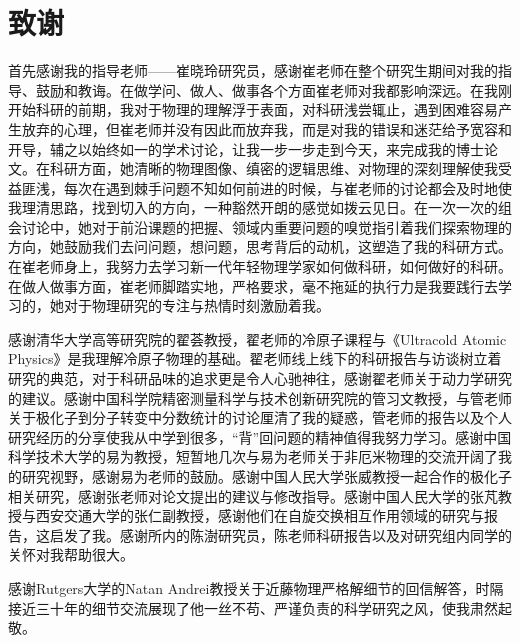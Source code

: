 \chapter[致谢]{致\quad 谢}%

首先感谢我的指导老师——崔晓玲研究员，感谢崔老师在整个研究生期间对我的指导、鼓励和教诲。在做学问、做人、做事各个方面崔老师对我都影响深远。在我刚开始科研的前期，我对于物理的理解浮于表面，对科研浅尝辄止，遇到困难容易产生放弃的心理，但崔老师并没有因此而放弃我，而是对我的错误和迷茫给予宽容和开导，辅之以始终如一的学术讨论，让我一步一步走到今天，来完成我的博士论文。在科研方面，她清晰的物理图像、缜密的逻辑思维、对物理的深刻理解使我受益匪浅，每次在遇到棘手问题不知如何前进的时候，与崔老师的讨论都会及时地使我理清思路，找到切入的方向，一种豁然开朗的感觉如拨云见日。在一次一次的组会讨论中，她对于前沿课题的把握、领域内重要问题的嗅觉指引着我们探索物理的方向，她鼓励我们去问问题，想问题，思考背后的动机，这塑造了我的科研方式。在崔老师身上，我努力去学习新一代年轻物理学家如何做科研，如何做好的科研。在做人做事方面，崔老师脚踏实地，严格要求，毫不拖延的执行力是我要践行去学习的，她对于物理研究的专注与热情时刻激励着我。

感谢清华大学高等研究院的翟荟教授，翟老师的冷原子课程与《Ultracold Atomic Physics》是我理解冷原子物理的基础。翟老师线上线下的科研报告与访谈树立着研究的典范，对于科研品味的追求更是令人心驰神往，感谢翟老师关于动力学研究的建议。感谢中国科学院精密测量科学与技术创新研究院的管习文教授，与管老师关于极化子到分子转变中分数统计的讨论厘清了我的疑惑，管老师的报告以及个人研究经历的分享使我从中学到很多，“背”回问题的精神值得我努力学习。感谢中国科学技术大学的易为教授，短暂地几次与易为老师关于非厄米物理的交流开阔了我的研究视野，感谢易为老师的鼓励。感谢中国人民大学张威教授一起合作的极化子相关研究，感谢张老师对论文提出的建议与修改指导。感谢中国人民大学的张芃教授与西安交通大学的张仁副教授，感谢他们在自旋交换相互作用领域的研究与报告，这启发了我。感谢所内的陈澍研究员，陈老师科研报告以及对研究组内同学的关怀对我帮助很大。

感谢Rutgers大学的Natan Andrei教授关于近藤物理严格解细节的回信解答，时隔接近三十年的细节交流展现了他一丝不苟、严谨负责的科学研究之风，使我肃然起敬。

